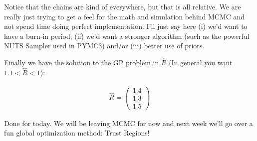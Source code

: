 \documentclass[12pt]{article}
\begin{document}
\vspace{5mm}

Notice that the chains are kind of everywhere, but that is all relative. We are really just trying to get a feel for the math and simulation behind MCMC and not spend time doing perfect implementation. I'll just say here (i) we'd want to have a burn-in period, (ii) we'd want a stronger algorithm (such as the powerful NUTS Sampler used in PYMC3) and/or (iii) better use of priors. 

\vspace{5mm}

Finally we have the solution to the GP problem in $\hat{R}$ (In general you want $1.1<\hat{R}<1$):

\begin{align*}
\hat{R} =
\begin{pmatrix}
1.4 \\ 1.3 \\ 1.5
\end{pmatrix}
\end{align*}

\vspace{5mm}

Done for today. We will be leaving MCMC for now and next week we'll go over a fun global optimization method: Trust Regions!
\end{document}
